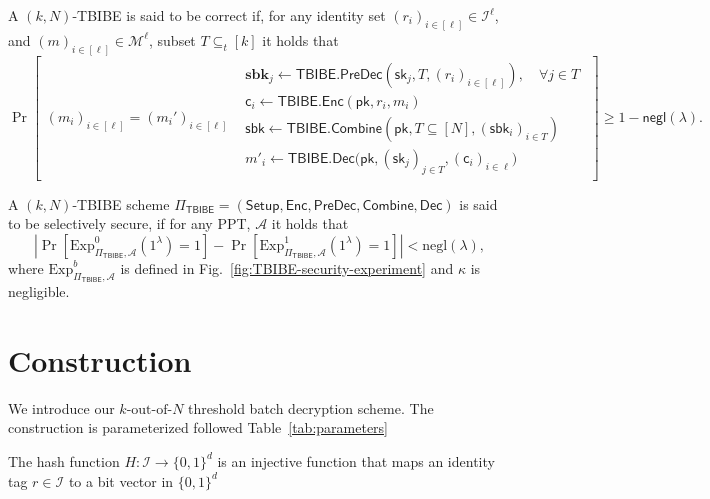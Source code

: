 \begin{definition}[Correctness]
\label{def:TBIBE_correctness}
A $(k,N)$-TBIBE is said to be correct if, for any identity set
$(r_i)_{i\in [\ell]} \in \mathcal{I}^\ell$, and $(m)_{i \in [\ell]} \in \mathcal{M}^\ell$, subset $T \subseteq_t [k]$
it holds that
\[
\Pr\left[
\begin{array}{c|l}
(m_i)_{i \in [\ell]} = (m_i')_{i \in [\ell]}
&
\begin{array}{l}
\mathbf{sbk}_j \leftarrow \mathsf{TBIBE.PreDec}( \mathsf{sk}_j, T, (r_i)_{i\in [\ell]}),
\quad \forall j \in T \\[2mm]
\mathsf{c}_i \leftarrow \mathsf{TBIBE.Enc}(\mathsf{pk}, r_i, m_i)\\[2mm] 
\mathsf{sbk} \leftarrow \mathsf{TBIBE.Combine}(\mathsf{pk},T\subseteq [N],(\mathsf{sbk}_i)_{i\in T})\\[2mm]
m'_i \leftarrow \mathsf{TBIBE.Dec}\bigl(\mathsf{pk},(\mathsf{sk}_j)_{j \in T}, (\mathsf{c}_i)_{i \in \ell}\bigr)
\end{array}
\end{array}
\right]
\geq 1 - \mathsf{negl}(\lambda).
\]
\end{definition}

\begin{definition}[Security]
\label{def:TBIBE_security}

A $(k,N)$-TBIBE scheme
$
\Pi_{\mathsf{TBIBE}} = (\mathsf{Setup}, \mathsf{Enc}, \mathsf{PreDec}, \mathsf{Combine}, \mathsf{Dec})
$
is said to be selectively secure, if for any PPT, $\mathcal{A}$
it holds that
\[
\left|
\Pr\left[\mathrm{Exp}^{0}_{\Pi_{\mathsf{TBIBE}},\mathcal{A}}(1^\lambda)=1\right]
-
\Pr\left[\mathrm{Exp}^{1}_{\Pi_{\mathsf{TBIBE}},\mathcal{A}}(1^\lambda)=1\right]
\right|
< \mathrm{negl}(\lambda),
\]
where $\mathrm{Exp}^{b}_{\Pi_{\mathsf{TBIBE}},\mathcal{A}}$ is defined in Fig.~\ref{fig:TBIBE-security-experiment} and $\kappa$ is negligible.
\end{definition}

\section{Construction}
We introduce our $k\text{-out-of-}N$ threshold batch decryption scheme. The construction is parameterized followed Table~\ref{tab:parameters}

\begin{definition}
\label{def:hash}
The hash function
$H : \mathcal{I} \to \{0,1\}^{d}$
is an injective function that maps an identity tag
$r \in \mathcal{I}$
to a bit vector in
$\{0,1\}^{d}$


\end{definition}

